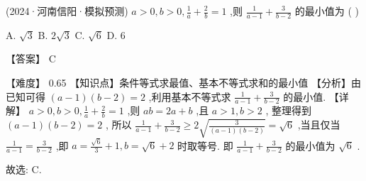 \documentclass[11pt,a4paper]{article}
\begin{document}
\begin{hmwk} 
 (2024·河南信阳·模拟预测) \(\displaystyle a > 0,b > 0,\frac{1}{a} + \frac{2}{b} = 1\) ,则 \(\displaystyle \frac{1}{a - 1} + \frac{3}{b - 2}\) 的最小值为 (   ) 
 
 A. \(\displaystyle \sqrt{3}\) B. \(\displaystyle 2\sqrt{3}\) C. \(\displaystyle \sqrt{6}\) D. 6 
 
 \begin{jiexi}
【答案】 \(\displaystyle \mathrm{C}\) 

【难度】 0.65 【知识点】条件等式求最值、基本不等式求和的最小值 【分析】由已知可得 \(\displaystyle \left( {a - 1}\right) \left( {b - 2}\right)  = 2\) ,利用基本不等式求 \(\displaystyle \frac{1}{a - 1} + \frac{3}{b - 2}\) 的最小值. 【详解】 \(\displaystyle a > 0,b > 0,\frac{1}{a} + \frac{2}{b} = 1\) ,则 \(\displaystyle {ab} = {2a} + b\) ,且 \(\displaystyle a > 1,b > 2\) , 整理得到 \(\displaystyle \left( {a - 1}\right) \left( {b - 2}\right)  = 2\) , 所以 \(\displaystyle \frac{1}{a - 1} + \frac{3}{b - 2} \geq  2\sqrt{\frac{3}{\left( {a - 1}\right) \left( {b - 2}\right) }} = \sqrt{6}\) ,当且仅当 \(\displaystyle \frac{1}{a - 1} = \frac{3}{b - 2}\) ,即 \(\displaystyle a = \frac{\sqrt{6}}{3} + 1,b = \sqrt{6} + 2\) 时取等号. 即 \(\displaystyle \frac{1}{a - 1} + \frac{3}{b - 2}\) 的最小值为 \(\displaystyle \sqrt{6}\) .

故选: C.

\end{jiexi}
\end{hmwk}
\end{document}
